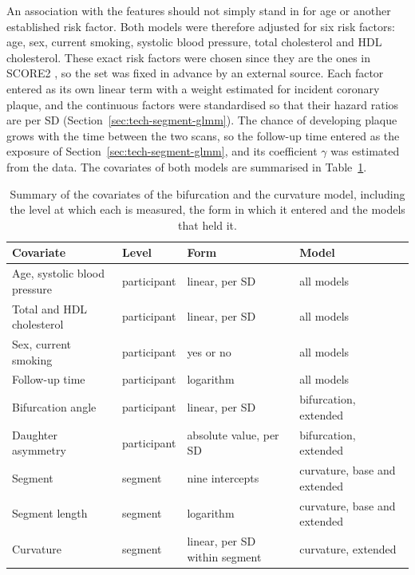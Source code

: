 \label{sec:method-covariates}%
An association with the features should not simply stand in for age or another established risk factor.
Both models were therefore adjusted for six risk factors: age, sex, current smoking, systolic blood pressure, total cholesterol and HDL cholesterol.
These exact risk factors were chosen since they are the ones in SCORE2 \cite{score2_2021}, so the set was fixed in advance by an external source.
Each factor entered as its own linear term with a weight estimated for incident coronary plaque, and the continuous factors were standardised so that their hazard ratios are per SD (Section~\ref{sec:tech-segment-glmm}).
The chance of developing plaque grows with the time between the two scans, so the follow-up time entered as the exposure of Section~\ref{sec:tech-segment-glmm}, and its coefficient $\gamma$ was estimated from the data.
The covariates of both models are summarised in Table~\ref{tab:method-covariates}.

\begin{table}[htbp]
  \centering
  \caption{Summary of the covariates of the bifurcation and the curvature model, including the level at which each is measured, the form in which it entered and the models that held it.}
  \label{tab:method-covariates}
  \begin{tabularx}{\textwidth}{>{\raggedright\arraybackslash}X l >{\raggedright\arraybackslash}p{2.5cm} >{\raggedright\arraybackslash}p{2.5cm}}
    \toprule
    Covariate & Level & Form & Model \\
    \midrule
    Age, systolic blood pressure & participant & linear, per SD & all models \\
    Total and HDL cholesterol & participant & linear, per SD & all models \\
    Sex, current smoking & participant & yes or no & all models \\
    Follow-up time & participant & logarithm & all models \\
    Bifurcation angle & participant & linear, per SD & bifurcation, extended \\
    Daughter asymmetry & participant & absolute value, per SD & bifurcation, extended \\
    Segment & segment & nine intercepts & curvature, base and extended \\
    Segment length & segment & logarithm & curvature, base and extended \\
    Curvature & segment & linear, per SD within segment & curvature, extended \\
    \bottomrule
  \end{tabularx}
\end{table}

